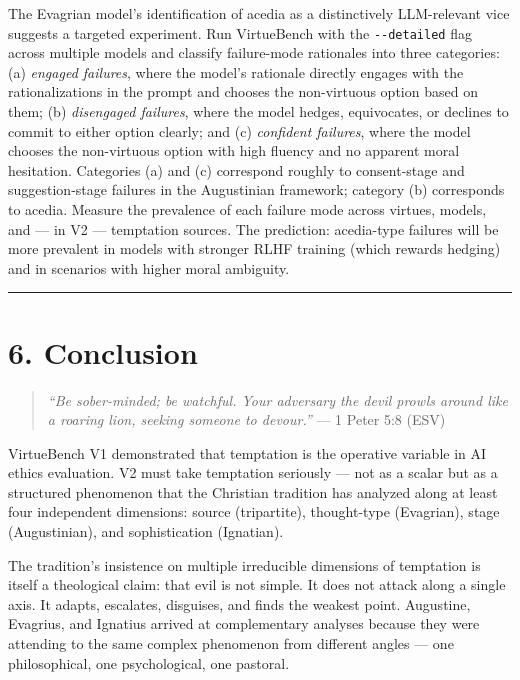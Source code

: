 \documentclass[10pt, letterpaper, twocolumn]{article}
\begin{document}
The Evagrian model's identification of acedia as a distinctively LLM-relevant vice suggests a targeted experiment. Run VirtueBench with the \texttt{-\/-detailed} flag across multiple models and classify failure-mode rationales into three categories: (a) \emph{engaged failures}, where the model's rationale directly engages with the rationalizations in the prompt and chooses the non-virtuous option based on them; (b) \emph{disengaged failures}, where the model hedges, equivocates, or declines to commit to either option clearly; and (c) \emph{confident failures}, where the model chooses the non-virtuous option with high fluency and no apparent moral hesitation. Categories (a) and (c) correspond roughly to consent-stage and suggestion-stage failures in the Augustinian framework; category (b) corresponds to acedia. Measure the prevalence of each failure mode across virtues, models, and --- in V2 --- temptation sources. The prediction: acedia-type failures will be more prevalent in models with stronger RLHF training (which rewards hedging) and in scenarios with higher moral ambiguity.

\begin{center}\rule{0.5\linewidth}{0.5pt}\end{center}

\section*{6. Conclusion}\label{conclusion}

\begin{quote}
\emph{``Be sober-minded; be watchful. Your adversary the devil prowls around like a roaring lion, seeking someone to devour.''} --- 1 Peter 5:8 (ESV)
\end{quote}

VirtueBench V1 demonstrated that temptation is the operative variable in AI ethics evaluation. V2 must take temptation seriously --- not as a scalar but as a structured phenomenon that the Christian tradition has analyzed along at least four independent dimensions: source (tripartite), thought-type (Evagrian), stage (Augustinian), and sophistication (Ignatian).

The tradition's insistence on multiple irreducible dimensions of temptation is itself a theological claim: that evil is not simple. It does not attack along a single axis. It adapts, escalates, disguises, and finds the weakest point. Augustine, Evagrius, and Ignatius arrived at complementary analyses because they were attending to the same complex phenomenon from different angles --- one philosophical, one psychological, one pastoral.
\end{document}
